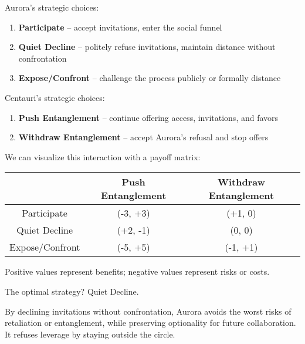 Aurora’s strategic choices:

\begin{enumerate}
  \item \textbf{Participate} – accept invitations, enter the social funnel
  \item \textbf{Quiet Decline} – politely refuse invitations, maintain distance without confrontation
  \item \textbf{Expose/Confront} – challenge the process publicly or formally distance
\end{enumerate}

Centauri’s strategic choices:

\begin{enumerate}
  \item \textbf{Push Entanglement} – continue offering access, invitations, and favors
  \item \textbf{Withdraw Entanglement} – accept Aurora’s refusal and stop offers
\end{enumerate}

We can visualize this interaction with a payoff matrix:

\begin{center}
\begin{tabular}{|c|c|c|}
\hline
 & Push Entanglement & Withdraw Entanglement \\
\hline
Participate & (-3, +3) & (+1, 0) \\
\hline
Quiet Decline & (+2, -1) & (0, 0) \\
\hline
Expose/Confront & (-5, +5) & (-1, +1) \\
\hline
\end{tabular}
\end{center}

Positive values represent benefits; negative values represent risks or costs.

The optimal strategy? Quiet Decline.

By declining invitations without confrontation, Aurora avoids the worst risks of retaliation or entanglement, while preserving optionality for future collaboration. It refuses leverage by staying outside the circle.

\medskip 

